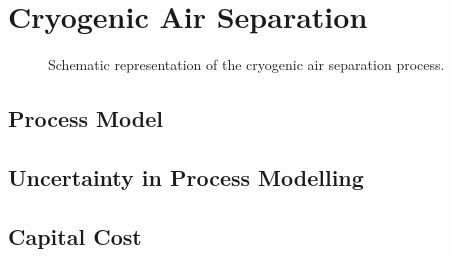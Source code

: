 \chapter{Cryogenic Air Separation}
\label{chp:cryo}

\begin{figure}
	
	\caption[Air Separation Unit]{Schematic representation of the cryogenic air separation process.}
	\label{fig:ASU}
\end{figure}

\section{Process Model}
\label{sec:model}

\section{Uncertainty in Process Modelling}
\label{sec:uncertainty}

\section{Capital Cost}
\label{sec:capex}

